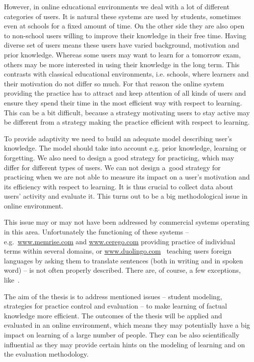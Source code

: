 \documentclass[table,color,cover,twoside,nolot,nolof]{fithesis3/fithesis3}
\begin{document}
However, in online educational environments we deal with a lot of different
categories of users. It is natural these systems are used by students,
sometimes even at schools for a fixed amount of time. On the other side they
are also open to non-school users willing to improve their knowledge in their
free time. Having diverse set of users means these users have varied
background, motivation and prior knowledge. Whereas some users may want to
learn for a tomorrow exam, others may be more interested in using their
knowledge in the long term. This contrasts with classical educational
environments, i.e. schools, where learners and their motivation do not differ
so much. For that reason the online system providing the practice has to
attract and keep attention of all kinds of users and ensure they spend
their time in the most efficient way with respect to learning. This can be a
bit difficult, because a strategy motivating users to stay active may be
different from a strategy making the practice efficient with respect to
learning.

To provide adaptivity we need to build an adequate model describing user's
knowledge. The model should take into account e.g. prior knowledge, learning or
forgetting. We also need to design a good strategy for practicing, which may
differ for different types of users. We can not design a~good strategy for
practicing when we are not able to measure its impact on a user's motivation and
its efficiency with respect to learning. It is thus crucial to collect data
about users' activity and evaluate it. This turns out to be a big
methodological issue in online environment.

This issue may or may not have been addressed by commercial systems operating
in this area. Unfortunately the functioning of these systems --
e.g.~\url{www.memrise.com} and \url{www.cerego.com} providing practice of
individual terms within several domains, or
\url{www.duolingo.com}~\cite{garcia2013learning} teaching users foreign
languages by asking them to translate sentences (both in writing and in spoken
word) -- is not often properly described. There are, of course, a few
exceptions, like~\cite{streeter2015mixture}.

The aim of the thesis is to address mentioned issues -- student modeling,
strategies for practice control and evaluation -- to make learning of factual
knowledge more efficient. The outcomes of the thesis will be applied and
evaluated in an online environment, which means they may potentially have a big
impact on learning of a large number of people. They can be also scientifically
influential as they may provide certain hints on the modeling of learning and
on the evaluation methodology.
\end{document}

